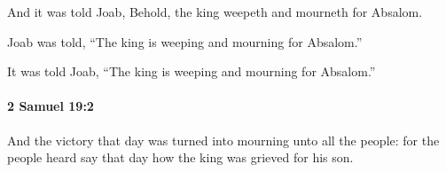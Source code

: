 			\begin{versebox}
					\item[BHS] 
					\item[ASV] And it was told Joab, Behold, the king weepeth and mourneth for Absalom.
					\item[NIV] Joab was told, “The king is weeping and mourning for Absalom.”
					\item[NRSV] It was told Joab, “The king is weeping and mourning for Absalom.”
			\end{versebox}

		\paragraph{2 Samuel 19:2} %
			\label{2SAMUEL-19-2}

			And the victory that day was turned into mourning unto all the people: for the people heard say that day how the king was grieved for his son.


